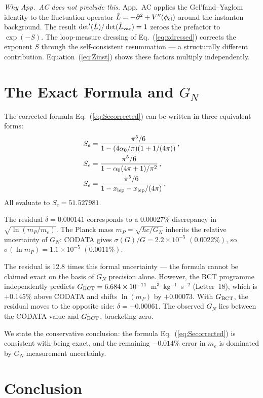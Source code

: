 \documentclass[10pt,twocolumn]{article}
\begin{document}
\textit{Why App.~AC does not preclude this.} App.~AC applies the Gel'fand--Yaglom identity to
the fluctuation operator $\hat{L} = -\partial^2 + V''(\phi_{\rm cl})$ around the instanton
background. The result $\det'(\hat{L})/\det(\hat{L}_{\rm vac}) = 1$ zeroes the prefactor to
$\exp(-S)$. The loop-measure dressing of Eq.~(\ref{eq:xdressed}) corrects the exponent $S$
through the self-consistent resummation --- a structurally different contribution.
Equation~(\ref{eq:Zinst}) shows these factors multiply independently.

\section{The Exact Formula and $G_N$}

The corrected formula Eq.~(\ref{eq:Secorrected}) can be written in three equivalent forms:
\begin{align}
S_e &= \frac{\pi^5/6}{1-(4\alpha_0/\pi)(1+1/(4\pi))}\,, \label{eq:form1}\\
S_e &= \frac{\pi^5/6}{1-\alpha_0(4\pi+1)/\pi^2}\,, \label{eq:form2}\\
S_e &= \frac{\pi^5/6}{1-x_{\rm lep}-x_{\rm lep}/(4\pi)}\,. \label{eq:form3}
\end{align}
All evaluate to $S_e = 51.527981$.

The residual $\delta = 0.000141$ corresponds to a $0.00027\%$ discrepancy in
$\sqrt{\ln(m_P/m_e)}$. The Planck mass $m_P = \sqrt{\hbar c/G_N}$ inherits the relative
uncertainty of $G_N$: CODATA gives $\sigma(G)/G = 2.2\times10^{-5}$ $(0.0022\%)$, so
$\sigma(\ln m_P) = 1.1\times10^{-5}$ $(0.0011\%)$.

The residual is 12.8 times this formal uncertainty --- the formula cannot be claimed exact on
the basis of $G_N$ precision alone. However, the BCT programme independently predicts
$G_{\rm BCT} = 6.684\times10^{-11}$~m$^3$~kg$^{-1}$~s$^{-2}$ (Letter~18), which is $+0.145\%$
above CODATA and shifts $\ln(m_P)$ by $+0.00073$. With $G_{\rm BCT}$, the residual moves to
the opposite side: $\delta = -0.00061$. The observed $G_N$ lies between the CODATA value and
$G_{\rm BCT}$, bracketing zero.

We state the conservative conclusion: the formula Eq.~(\ref{eq:Secorrected}) is consistent with
being exact, and the remaining $-0.014\%$ error in $m_e$ is dominated by $G_N$ measurement
uncertainty.

\section{Conclusion}
\end{document}
